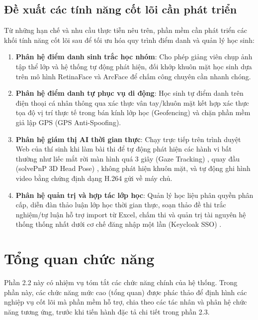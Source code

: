 \documentclass[../DoAn.tex]{subfiles}
\begin{document}
\subsection{Đề xuất các tính năng cốt lõi cần phát triển}

\label{subsection:2.1.4}

Từ những hạn chế và nhu cầu thực tiễn nêu trên, phần mềm cần phát triển các khối tính năng cốt lõi sau để tối ưu hóa quy trình điểm danh và quản lý học sinh:
\begin{enumerate}
    \item \textbf{Phân hệ điểm danh sinh trắc học nhóm}: Cho phép giảng viên chụp ảnh tập thể lớp và hệ thống tự động phát hiện, đối khớp khuôn mặt học sinh dựa trên mô hình RetinaFace \cite{Deng_2020_CVPR} và ArcFace \cite{Deng_2019_CVPR} để chấm công chuyên cần nhanh chóng.
    \item \textbf{Phân hệ điểm danh tự phục vụ di động}: Học sinh tự điểm danh trên điện thoại cá nhân thông qua xác thực vân tay/khuôn mặt kết hợp xác thực tọa độ vị trí thực tế trong bán kính lớp học (Geofencing) và chặn phần mềm giả lập GPS (GPS Anti-Spoofing).
    \item \textbf{Phân hệ giám thị AI thời gian thực}: Chạy trực tiếp trên trình duyệt Web của thí sinh khi làm bài thi để tự động phát hiện các hành vi bất thường như liếc mắt rời màn hình quá 3 giây (Gaze Tracking) \cite{kaundinya2026inbrowser}, quay đầu (solvePnP 3D Head Pose) \cite{Lepetit2009EPnP}, không phát hiện khuôn mặt, và tự động ghi hình video bằng chứng định dạng H.264 gửi về máy chủ.
    \item \textbf{Phân hệ quản trị và hợp tác lớp học}: Quản lý học liệu phân quyền phân cấp, diễn đàn thảo luận lớp học thời gian thực, soạn thảo đề thi trắc nghiệm/tự luận hỗ trợ import từ Excel, chấm thi và quản trị tài nguyên hệ thống thống nhất dưới cơ chế đăng nhập một lần (Keycloak SSO) \cite{keycloak2026}.
\end{enumerate}

\section{Tổng quan chức năng}

\label{section:2.2}

Phần 2.2 này có nhiệm vụ tóm tắt các chức năng chính của hệ thống. Trong phần này, các chức năng mức cao (tổng quan) được phác thảo để định hình các nghiệp vụ cốt lõi mà phần mềm hỗ trợ, chia theo các tác nhân và phân hệ chức năng tương ứng, trước khi tiến hành đặc tả chi tiết trong phần 2.3.
\end{document}
